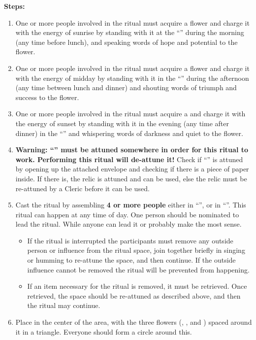 \documentclass[green]{GL2020}
\begin{document}
\textbf{Steps:}
\begin{enumerate}
  \item One or more people involved in the ritual must acquire a \iMorningGlory{} flower and charge it with the energy of sunrise by standing with it at the ``\pGarden{}'' during the morning (any time before lunch), and speaking words of hope and potential to the flower. 
  \item One or more people involved in the ritual must acquire a \iLily{} flower and charge it with the energy of midday by standing with it in the ``\pTrainingField{}'' during the afternoon (any time between lunch and dinner) and shouting words of triumph and success to the flower.
  \item One or more people involved in the ritual must acquire a \iMoonflower{} and charge it with the energy of sunset by standing with it in the evening (any time after dinner)  in the ``\pGraveyard{}'' and whispering words of darkness and quiet to the flower.
  \item \textbf{Warning: ``\iMirror{}'' must be attuned somewhere in order for this ritual to work. Performing this ritual will de-attune it!} Check if ``\iMirror{}'' is attuned by opening up the attached envelope and checking if there is a piece of paper inside. If there is, the relic is attuned and can be used, else the relic must be re-attuned by a Cleric before it can be used.
  \item Cast the ritual by assembling \textbf{4 or more people} either in ``\sTeacherGeneral{}'', or in ``\sTemple{}''. This ritual can happen at any time of day. One person should be nominated to lead the ritual. While anyone can lead it \cWildCard{} or \cChupStudent{} probably make the most sense. 
  \begin{itemize}
  \item  If the ritual is interrupted the participants must remove any outside person or influence from the ritual space, join together briefly in singing or humming to re-attune the space, and then continue. If the outside influence cannot be removed the ritual will be prevented from happening.
  \item If an item necessary for the ritual is removed, it must be retrieved. Once retrieved, the space should be re-attuned as described above, and then the ritual may continue.
  \end{itemize}
  \item Place \iMirror{} in the center of the area, with the three flowers (\iMorningGlory{}, \iLily{}, and \iMoonflower{}) spaced around it in a triangle. Everyone should form a circle around this.

\end{enumerate}
\end{document}
